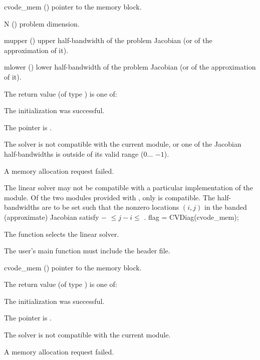 {
  \begin{args}
  \item[cvode\_mem] ()
    pointer to the {\cvodes} memory block.
  \item[N] ()
    problem dimension.
  \item[mupper] ()
    upper half-bandwidth of the problem Jacobian (or of the approximation of it).
  \item[mlower] ()
    lower half-bandwidth of the problem Jacobian (or of the approximation of it).
  \end{args}
}
{
  The return value  (of type ) is one of:
  \begin{args}
  \item[\Id{CVBAND\_SUCCESS}] 
    The {\cvband} initialization was successful.
  \item[\Id{CVBAND\_MEM\_NULL}]
    The  pointer is .
  \item[\Id{CVBAND\_ILL\_INPUT}]
    The {\cvband} solver is not compatible with the current {\nvector} module, or
    one of the Jacobian half-bandwidths is outside of its valid range
    ($0 \ldots$ $-1$).
  \item[\Id{CVBAND\_MEM\_FAIL}]
    A memory allocation request failed.
  \end{args}
}
{
  The {\cvband} linear solver may not be compatible with a particular
  implementation of the {\nvector} module. Of the two {\nvector} modules 
  provided with {\sundials}, only {\nvecs} is compatible.
  The half-bandwidths are to be set such that the nonzero locations $(i,j)$ in the
  banded (approximate) Jacobian satisfy $-$ $\leq j-i \leq$ .
}
{
  flag = CVDiag(cvode\_mem);
}
{
  The function  selects the {\cvdiag} linear solver. 

  The user's main function must include the  header file.
}
{
  \begin{args}
  \item[cvode\_mem] ()
    pointer to the {\cvodes} memory block.
  \end{args}
}
{
  The return value  (of type ) is one of:
  \begin{args}
  \item[\Id{CVDIAG\_SUCCESS}]
    The {\cvdiag} initialization was successful.
  \item[\Id{CVDIAG\_MEM\_NULL}]
    The  pointer is .
  \item[\Id{CVDIAG\_ILL\_INPUT}]
    The {\cvdiag} solver is not compatible with the current {\nvector} module.
  \item[\Id{CVDIAG\_MEM\_FAIL}]
    A memory allocation request failed.
  \end{args}
}
